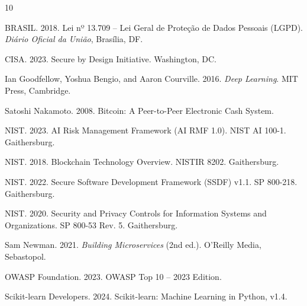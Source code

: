 \documentclass[sigconf,nonacm]{acmart}
\begin{document}
\begin{thebibliography}{10}

BRASIL. 2018. Lei nº 13.709 -- Lei Geral de Proteção de Dados Pessoais (LGPD). \textit{Diário Oficial da União}, Brasília, DF.

CISA. 2023. Secure by Design Initiative. Washington, DC.

Ian Goodfellow, Yoshua Bengio, and Aaron Courville. 2016. \textit{Deep Learning}. MIT Press, Cambridge.

Satoshi Nakamoto. 2008. Bitcoin: A Peer-to-Peer Electronic Cash System.

NIST. 2023. AI Risk Management Framework (AI RMF 1.0). NIST AI 100-1. Gaithersburg.

NIST. 2018. Blockchain Technology Overview. NISTIR 8202. Gaithersburg.

NIST. 2022. Secure Software Development Framework (SSDF) v1.1. SP 800-218. Gaithersburg.

NIST. 2020. Security and Privacy Controls for Information Systems and Organizations. SP 800-53 Rev. 5. Gaithersburg.

Sam Newman. 2021. \textit{Building Microservices} (2nd ed.). O'Reilly Media, Sebastopol.

OWASP Foundation. 2023. OWASP Top 10 -- 2023 Edition.

Scikit-learn Developers. 2024. Scikit-learn: Machine Learning in Python, v1.4.

\end{thebibliography}
\end{document}
